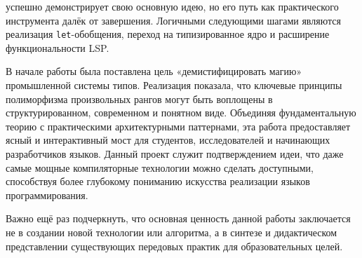 \Arralac успешно демонстрирует свою основную идею, но его путь как практического инструмента далёк от завершения. Логичными следующими шагами являются реализация \texttt{let}-обобщения, переход на типизированное ядро и расширение функциональности LSP.

В начале работы была поставлена цель «демистифицировать магию» промышленной системы типов. Реализация \Arralac показала, что ключевые принципы полиморфизма произвольных рангов могут быть воплощены в структурированном, современном и понятном виде. Объединяя фундаментальную теорию с практическими архитектурными паттернами, эта работа предоставляет ясный и интерактивный мост для студентов, исследователей и начинающих разработчиков языков. Данный проект служит подтверждением идеи, что даже самые мощные компиляторные технологии можно сделать доступными, способствуя более глубокому пониманию искусства реализации языков программирования.

Важно ещё раз подчеркнуть, что основная ценность данной работы заключается не в создании новой технологии или алгоритма, а в синтезе и дидактическом представлении существующих передовых практик для образовательных целей.
